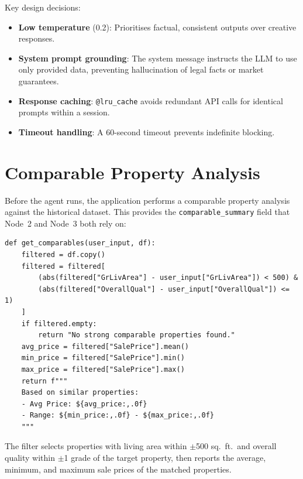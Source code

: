 \documentclass[11pt,a4paper]{article}
\begin{document}
Key design decisions:

\begin{itemize}[leftmargin=*]
    \item \textbf{Low temperature} (0.2): Prioritises factual, consistent outputs over creative responses.
    \item \textbf{System prompt grounding}: The system message instructs the LLM to use only provided data, preventing hallucination of legal facts or market guarantees.
    \item \textbf{Response caching}: \texttt{@lru\_cache} avoids redundant API calls for identical prompts within a session.
    \item \textbf{Timeout handling}: A 60-second timeout prevents indefinite blocking.
\end{itemize}

\section{Comparable Property Analysis}

Before the agent runs, the application performs a comparable property analysis against the historical dataset.
This provides the \texttt{comparable\_summary} field that Node~2 and Node~3 both rely on:

\begin{lstlisting}[caption={Comparable analysis (\texttt{src/core/comparable.py}); excerpt shown with original return format.}]
def get_comparables(user_input, df):
    filtered = df.copy()
    filtered = filtered[
        (abs(filtered["GrLivArea"] - user_input["GrLivArea"]) < 500) &
        (abs(filtered["OverallQual"] - user_input["OverallQual"]) <= 1)
    ]
    if filtered.empty:
        return "No strong comparable properties found."
    avg_price = filtered["SalePrice"].mean()
    min_price = filtered["SalePrice"].min()
    max_price = filtered["SalePrice"].max()
    return f"""
    Based on similar properties:
    - Avg Price: ${avg_price:,.0f}
    - Range: ${min_price:,.0f} - ${max_price:,.0f}
    """
\end{lstlisting}

The filter selects properties with living area within $\pm$500 sq.\ ft.\ and overall quality within $\pm$1 grade of the target property, then reports the average, minimum, and maximum sale prices of the matched properties.
\end{document}
